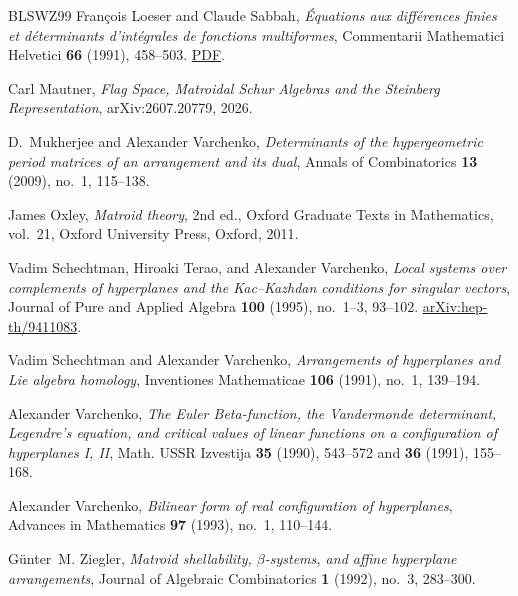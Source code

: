 \begin{thebibliography}{BLSWZ99}
Fran\c{c}ois Loeser and Claude Sabbah, \emph{\'Equations aux
diff\'erences finies et d\'eterminants d'int\'egrales de fonctions
multiformes}, Commentarii Mathematici Helvetici \textbf{66} (1991),
458--503.
\href{https://perso.pages.math.cnrs.fr/users/claude.sabbah/articles/loeser-sabbah91.pdf}{PDF}.

Carl Mautner, \emph{Flag Space, Matroidal {S}chur Algebras and the {S}teinberg Representation}, arXiv:2607.20779, 2026.


D.~Mukherjee and Alexander Varchenko, \emph{Determinants of the
  hypergeometric period matrices of an arrangement and its dual}, Annals
  of Combinatorics \textbf{13} (2009), no.~1, 115--138.

James Oxley, \emph{Matroid theory}, 2nd ed., Oxford Graduate Texts in
  Mathematics, vol.~21, Oxford University Press, Oxford, 2011.

Vadim Schechtman, Hiroaki Terao, and Alexander Varchenko,
\emph{Local systems over complements of hyperplanes and the
Kac--Kazhdan conditions for singular vectors}, Journal of Pure and
Applied Algebra \textbf{100} (1995), no.~1--3, 93--102.
\href{https://arxiv.org/abs/hep-th/9411083}{arXiv:hep-th/9411083}.

Vadim Schechtman and Alexander Varchenko, \emph{Arrangements of
hyperplanes and Lie algebra homology}, Inventiones Mathematicae
\textbf{106} (1991), no.~1, 139--194.

Alexander Varchenko, \emph{The {E}uler {B}eta-function, the {V}andermonde determinant, {L}egendre's equation, and critical values of linear functions on a configuration of hyperplanes {I, II}}, Math. USSR
Izvestija \textbf{35} (1990), 543--572 and \textbf{36} (1991), 155--168.

Alexander Varchenko, \emph{Bilinear form of real configuration of
hyperplanes}, Advances in Mathematics \textbf{97} (1993), no.~1,
110--144.

G{\"u}nter~M. Ziegler, \emph{Matroid shellability, \(\beta\)-systems,
  and affine hyperplane arrangements}, Journal of Algebraic Combinatorics
  \textbf{1} (1992), no.~3, 283--300.

\end{thebibliography}

